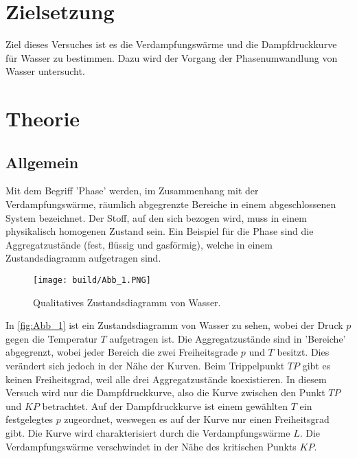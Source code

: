 \section{Zielsetzung}
\label{sec: Zielsetzung}
Ziel dieses Versuches ist es die Verdampfungswärme und die Dampfdruckkurve für Wasser zu bestimmen. 
Dazu wird der Vorgang der Phasenumwandlung von Wasser untersucht.

\section{Theorie}
\label{sec:Theorie}
\subsection{Allgemein} %
\label{sub:Allgemein}
Mit dem Begriff 'Phase'  werden, im Zusammenhang mit der Verdampfungswärme, räumlich abgegrenzte Bereiche in einem abgeschlossenen System bezeichnet.
Der Stoff, auf den sich bezogen wird, muss in einem physikalisch homogenen Zustand sein. 
Ein Beispiel für die Phase sind die Aggregatzustände (fest, flüssig und gasförmig), welche in einem Zustandsdiagramm aufgetragen sind.
\begin{figure}[H]
    \centering
    \texttt{[image: build/Abb\_1.PNG]}
    \caption {Qualitatives Zustandsdiagramm von Wasser.\cite{V203}}
    \label{fig:Abb_1}
\end{figure}
In \autoref{fig:Abb_1} ist ein Zustandsdiagramm von Wasser zu sehen, wobei der Druck $p$ gegen die Temperatur $T$ aufgetragen ist.
Die Aggregatzustände sind in 'Bereiche' abgegrenzt, wobei jeder Bereich die zwei Freiheitsgrade $p$ und $T$ besitzt.
Dies verändert sich jedoch in der Nähe der Kurven. 
Beim Trippelpunkt $TP$ gibt es keinen Freiheitsgrad, weil alle drei Aggregatzustände koexistieren.
In diesem Versuch wird nur die Dampfdruckkurve, also die Kurve zwischen den Punkt $TP$ und $KP$ betrachtet.
Auf der Dampfdruckkurve ist einem gewählten $T$ ein festgelegtes $p$ zugeordnet, weswegen es auf der Kurve nur einen Freiheitsgrad gibt. Die Kurve wird charakterisiert durch die Verdampfungswärme $L$.
Die Verdampfungswärme verschwindet in der Nähe des kritischen Punkts $KP$.

